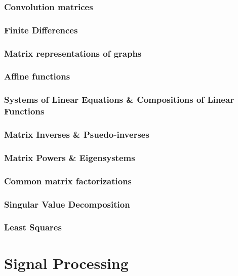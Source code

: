 \documentclass[10pt]{article}
\begin{document}
\subsubsection{Convolution matrices}

\subsubsection{Finite Differences}

\subsubsection{Matrix representations of graphs}

\subsubsection{Affine functions}

\subsubsection{Systems of Linear Equations \& Compositions of Linear Functions}

\subsubsection{Matrix Inverses \& Psuedo-inverses}

\subsubsection{Matrix Powers \& Eigensystems}

\subsubsection{Common matrix factorizations}

\subsubsection{Singular Value Decomposition}

\subsubsection{Least Squares}

\section{Signal Processing}
\end{document}
